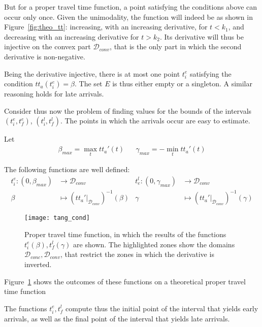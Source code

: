 But for a proper travel time function,
a point satisfying the conditions above can occur only once.
Given the unimodality,
the function will indeed be as shown in Figure~\ref{fig:theo_tt}: increasing, with an increasing derivative,
for \(t < k_1\), and decreasing with an increasing derivative for \(t > k_2\).
Its derivative will thus be injective on the convex part \(\mathcal{D}_{conv}\),
that is the only part in which the second derivative is non-negative.

Being the derivative injective,
there is at most one point \(t_i^e\) satisfying the condition \(tt_a(t_i^e) = \beta\).
The set \(E\) is thus either empty or a singleton.
A similar reasoning holds for late arrivals.

Consider thus now the problem of finding values for the bounds of the intervals \((t_i^e, t_f^e)\), \((t_i^l, t_f^l)\).
The points in which the arrivals occur are easy to estimate.

Let
\begin{align}
  \label{eq:b_max-g_max-def}
  \beta_{max} = \max_t tt_a'(t) && \gamma_{max} = -\min_t tt_a'(t)
\end{align}

The following functions are well defined:
\begin{equation}
  \label{eq:def-inv-der}
  \begin{aligned}
    t_i^e: (0, \beta_{max}) & \rightarrow \mathcal{D}_{conv}  & t_e^l: (0, \gamma_{max}) & \rightarrow \mathcal{D}_{conv} \\
    \beta & \mapsto (tt_a' |_{\mathcal{D}_{conv}})^{-1}(\beta) & \gamma & \mapsto(tt_a' |_{\mathcal{D}_{conv}})^{-1}(\gamma)
  \end{aligned}
\end{equation}
\begin{figure}
  \centering
  \texttt{[image: tang\_cond]}
  \caption{
    Proper travel time function,
    in which the results of the functions \(t_i^e(\beta), t_f^l(\gamma)\) are shown.
    The highlighted zones show the domains \(\mathcal{D}_{conc}, \mathcal{D}_{conv}\),
    that restrict the zones in which the derivative is inverted.
}
  \label{fig:tang-cond}
\end{figure}

Figure~\ref{fig:tang-cond} shows the outcomes of these functions on a theoretical proper travel time function

The functions \(t_i^e, t_f^l\) compute thus the initial point of the interval that yields early arrivals,
as well as the final point of the interval that yields late arrivals.

